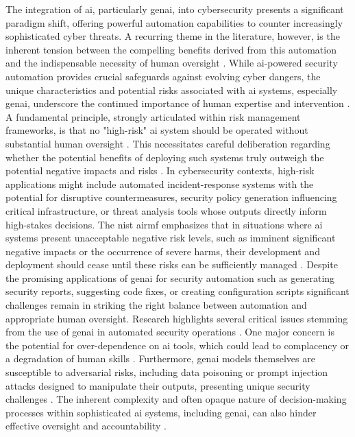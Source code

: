 The integration of \gls{ai}, particularly \gls{genai}, into cybersecurity presents a significant paradigm shift, offering powerful automation capabilities to counter increasingly sophisticated cyber threats. A recurring theme in the literature, however, is the inherent tension between the compelling benefits derived from this automation and the indispensable necessity of human oversight \cite{seth_ai_2025}. While \gls{ai}-powered security automation provides crucial safeguards against evolving cyber dangers, the unique characteristics and potential risks associated with \gls{ai} systems, especially \gls{genai}, underscore the continued importance of human expertise and intervention \cite{seth_ai_2025, patel_generative_2025}.
A fundamental principle, strongly articulated within risk management frameworks, is that no "high-risk" \gls{ai} system should be operated without substantial human oversight \cite[p.7]{tabassi_artificial_2023}. This necessitates careful deliberation regarding whether the potential benefits of deploying such systems truly outweigh the potential negative impacts and risks \cite{tabassi_artificial_2023}. In cybersecurity contexts, high-risk applications might include automated \gls{incident-response} systems with the potential for disruptive countermeasures, security policy generation influencing critical infrastructure, or threat analysis tools whose outputs directly inform high-stakes decisions. The \gls{nist} \gls{airmf} emphasizes that in situations where \gls{ai} systems present unacceptable negative risk levels, such as imminent significant negative impacts or the occurrence of severe harms, their development and deployment should cease until these risks can be sufficiently managed \cite{tabassi_artificial_2023}.
Despite the promising applications of \gls{genai} for security automation such as generating security reports, suggesting code fixes, or creating configuration scripts significant challenges remain in striking the right balance between automation and appropriate human oversight. Research highlights several critical issues stemming from the use of \gls{genai} in automated security operations \cite{patel_generative_2025}. One major concern is the potential for over-dependence on \gls{ai} tools, which could lead to complacency or a degradation of human skills \cite{patel_generative_2025}. Furthermore, \gls{genai} models themselves are susceptible to adversarial risks, including data poisoning or prompt injection attacks designed to manipulate their outputs, presenting unique security challenges \cite{patel_generative_2025}. The inherent complexity and often opaque nature of decision-making processes within sophisticated \gls{ai} systems, including \gls{genai}, can also hinder effective oversight and accountability \cite{tabassi_artificial_2023} \cite{patel_generative_2025}.
